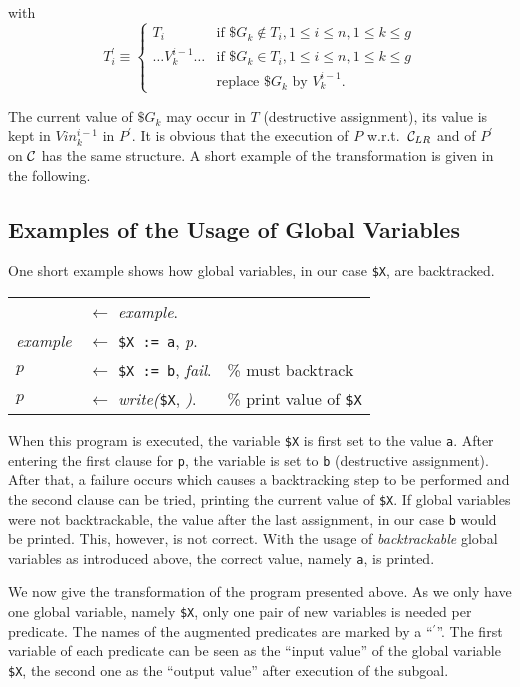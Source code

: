 with
\[ T^\prime_i \equiv 
         \left\{
  \begin{array}{ll}
    T_i  &
    \mbox{if ${\$G}_k \not\in T_i , 1 \leq i \leq n , 1 \leq k \leq g$} \\
    \ldots V^{i-1}_k \ldots & 
    \mbox{if ${\$G}_k \in T_i , 1 \leq i \leq n , 1 \leq k \leq g$} \\ 
    \   &
    \mbox{replace ${\$G}_k$ by $V^{i-1}_k$.}
  \end{array}
         \right.
\]

The current value of ${\$G}_k$ may occur in $T$ (destructive assignment), its
value is kept in $Vin^{i-1}_k$ in $P^\prime$.
It is obvious that the execution of $P$ w.r.t.\ ${\cal C}_{LR}$ and
of $P^\prime$ on $\cal C$ has the same structure.
A short example of the transformation is given in the following.

\subsection{Examples of the Usage of Global Variables}
One short example shows how global variables, in our case {\tt \$X},
are backtracked.

\begin{center}
\begin{tabular}{lll}
& $\leftarrow$ {\em example}.& \\
 {\em example} & $\leftarrow$ {\tt \$X := a}, {\em p}.& \\
$p$ & $\leftarrow$ {\tt \$X := b}, {\em fail}.& \% must backtrack\\
$p$ & $\leftarrow$ {\em write(\/}{\tt \$X}, {\em )}.& \% print value of {\tt \$X}
\end{tabular}
\end{center}

When this program is executed, the variable {\tt \$X} is first set to
the value {\tt a}. After entering the first clause for {\tt p}, the variable
is set to {\tt b} (destructive assignment). After that, a failure occurs
which causes a backtracking step to be performed and the second clause
can be tried, printing the current value of {\tt \$X}.
If global variables were not
backtrackable, the value after the last assignment, in our case {\tt b}
would be printed. This, however, is not correct.
With the usage of {\em backtrackable\/} global variables as introduced
above, the correct value, namely {\tt a}, is printed.

We now give the transformation of the program presented above. As we only
have one global variable, namely {\tt \$X}, only one pair of new variables
is needed per predicate. The names of the augmented predicates are
marked by a ``$^\prime$''. The first variable of each predicate can be seen
as the ``input value'' of the global variable {\tt \$X}, the second one
as the ``output value'' after execution of the subgoal.


